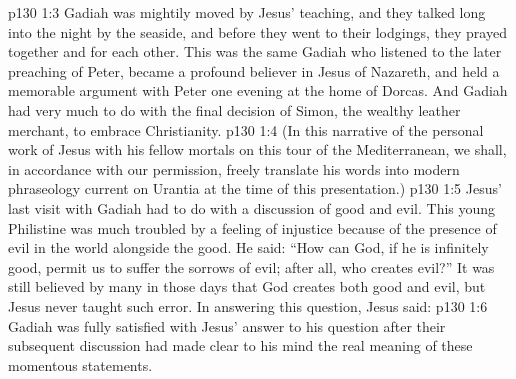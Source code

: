 \vs p130 1:3 Gadiah was mightily moved by Jesus’ teaching, and they talked long into the night by the seaside, and before they went to their lodgings, they prayed together and for each other. This was the same Gadiah who listened to the later preaching of Peter, became a profound believer in Jesus of Nazareth, and held a memorable argument with Peter one evening at the home of Dorcas. And Gadiah had very much to do with the final decision of Simon, the wealthy leather merchant, to embrace Christianity.
\vs p130 1:4 \pc (In this narrative of the personal work of Jesus with his fellow mortals on this tour of the Mediterranean, we shall, in accordance with our permission, freely translate his words into modern phraseology current on Urantia at the time of this presentation.)
\vs p130 1:5 \pc Jesus’ last visit with Gadiah had to do with a discussion of good and evil. This young Philistine was much troubled by a feeling of injustice because of the presence of evil in the world alongside the good. He said: “How can God, if he is infinitely good, permit us to suffer the sorrows of evil; after all, who creates evil?” It was still believed by many in those days that God creates both good and evil, but Jesus never taught such error. In answering this question, Jesus said: 
\vs p130 1:6  Gadiah was fully satisfied with Jesus’ answer to his question after their subsequent discussion had made clear to his mind the real meaning of these momentous statements.
